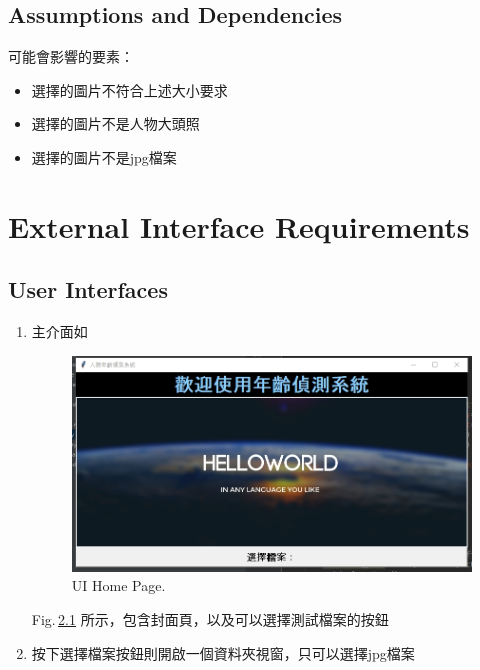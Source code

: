\documentclass{scrreprt}
\begin{document}
\begin{CJK}{UTF8}{bkai}
\section{Assumptions and Dependencies}
可能會影響的要素：
\begin{itemize}
    \item 選擇的圖片不符合上述大小要求
    \item 選擇的圖片不是人物大頭照
    \item 選擇的圖片不是jpg檔案
\end{itemize}

\chapter{External Interface Requirements}

\section{User Interfaces}
\vspace{0.9cm}
\begin{enumerate}
    \item 主介面如
    \begin{figure}[htb]
        \begin{center}
            \includegraphics[scale=0.7]{image/UiHomePage.png}%
        \end{center}
        \caption{UI Home Page.}
        \label{fig:1}
    \end{figure}
    Fig.\,\ref{fig:1} 所示，包含封面頁，以及可以選擇測試檔案的按鈕\\
    \vspace{5.7cm}
    \item 按下選擇檔案按鈕則開啟一個資料夾視窗，只可以選擇jpg檔案
    \begin{figure}[htb]
        \begin{center}

\end{center}
\end{figure}
\end{enumerate}
\end{CJK}
\end{document}
